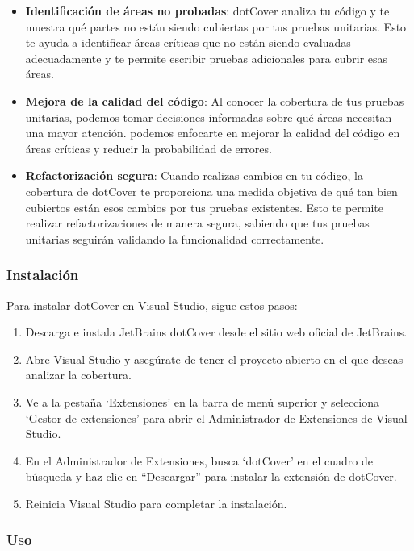\documentclass[executivepaper]{article}
\begin{document}
\begin{itemize}
  \item \textbf{Identificación de áreas no probadas}: dotCover analiza tu código y te muestra qué partes no están siendo cubiertas por tus pruebas unitarias. Esto te ayuda a identificar áreas críticas que no están siendo evaluadas adecuadamente y te permite escribir pruebas adicionales para cubrir esas áreas.
  \item \textbf{Mejora de la calidad del código}: Al conocer la cobertura de tus pruebas unitarias, podemos tomar decisiones informadas sobre qué áreas necesitan una mayor atención. podemos enfocarte en mejorar la calidad del código en áreas críticas y reducir la probabilidad de errores.
  \item \textbf{Refactorización segura}: Cuando realizas cambios en tu código, la cobertura de dotCover te proporciona una medida objetiva de qué tan bien cubiertos están esos cambios por tus pruebas existentes. Esto te permite realizar refactorizaciones de manera segura, sabiendo que tus pruebas unitarias seguirán validando la funcionalidad correctamente.
\end{itemize}

\subsubsection*{Instalación}

Para instalar dotCover en Visual Studio, sigue estos pasos:

\begin{enumerate}
  \item Descarga e instala JetBrains dotCover desde el sitio web oficial de JetBrains.
  \item Abre Visual Studio y asegúrate de tener el proyecto abierto en el que deseas analizar la cobertura.
  \item Ve a la pestaña \enquote*{Extensiones} en la barra de menú superior y selecciona \enquote*{Gestor de extensiones} para abrir el Administrador de Extensiones de Visual Studio.
  \item En el Administrador de Extensiones, busca \enquote*{dotCover} en el cuadro de búsqueda y haz clic en \enquote{Descargar} para instalar la extensión de dotCover.
  \item Reinicia Visual Studio para completar la instalación.
\end{enumerate}

\subsubsection*{Uso}
\end{document}
